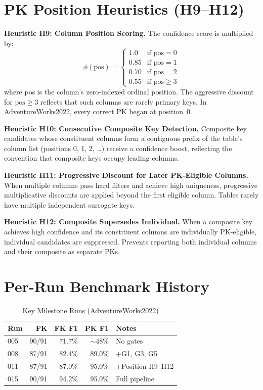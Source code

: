 \documentclass[sigconf, nonacm]{acmart}
\begin{document}
\section{PK Position Heuristics (H9--H12)}\label{app:position}

\textbf{Heuristic H9: Column Position Scoring.} The confidence score is multiplied by:
\begin{equation}
\phi(\text{pos}) = \begin{cases} 1.0 & \text{if } \text{pos} = 0 \\ 0.85 & \text{if } \text{pos} = 1 \\ 0.70 & \text{if } \text{pos} = 2 \\ 0.55 & \text{if } \text{pos} \geq 3 \end{cases}
\end{equation}
where pos is the column's zero-indexed ordinal position. The aggressive discount for $\text{pos} \geq 3$ reflects that such columns are rarely primary keys. In AdventureWorks2022, every correct PK began at position~0.

\textbf{Heuristic H10: Consecutive Composite Key Detection.} Composite key candidates whose constituent columns form a contiguous prefix of the table's column list (positions 0, 1, 2, \ldots) receive a confidence boost, reflecting the convention that composite keys occupy leading columns.

\textbf{Heuristic H11: Progressive Discount for Later PK-Eligible Columns.} When multiple columns pass hard filters and achieve high uniqueness, progressive multiplicative discounts are applied beyond the first eligible column. Tables rarely have multiple independent surrogate keys.

\textbf{Heuristic H12: Composite Supersedes Individual.} When a composite key achieves high confidence and its constituent columns are individually PK-eligible, individual candidates are suppressed. Prevents reporting both individual columns and their composite as separate PKs.


\section{Per-Run Benchmark History}

\begin{table}[htbp]
\caption{Key Milestone Runs (AdventureWorks2022)}
\label{tab:history}
\begin{tabular}{lrrrp{3cm}}
\toprule
\textbf{Run} & \textbf{FK} & \textbf{FK F1} & \textbf{PK F1} & \textbf{Notes} \\
\midrule
005 & 90/91 & 71.7\% & $\sim$48\% & No gates \\
008 & 87/91 & 82.4\% & 89.0\% & +G1, G3, G5 \\
011 & 87/91 & 87.0\% & 95.0\% & +Position H9--H12 \\
015 & 90/91 & 94.2\% & 95.0\% & Full pipeline \\
\bottomrule
\end{tabular}
\end{table}
\end{document}
